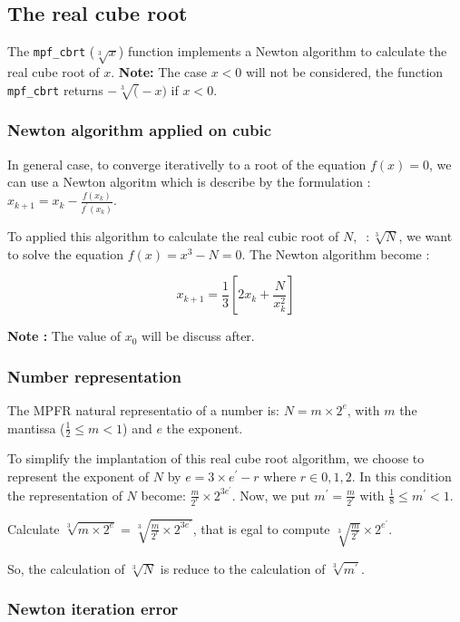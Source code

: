 \documentclass[12pt]{amsart}
\begin{document}
\subsection{The real cube root}

The {\tt mpf\_cbrt} ($\sqrt[3]{x}$) function implements a Newton
algorithm to calculate the real cube root of $x$. {\bf Note:} The case
$x<0$ will not be considered, the function {\tt mpf\_cbrt} returns $-\sqrt[3](-x)$ if $x<0$.

\subsubsection{Newton algorithm applied on cubic}

In general case, to converge iterativelly to a
root of the equation $f(x)=0$, we can use a Newton algoritm which is describe by the formulation :
$x_{k+1}=x_k-\frac{f(x_k)}{f^{'}(x_k)}$.

To applied this algorithm to calculate the real cubic root of
$N,\;\;: \sqrt[3]{N}$, we want to solve the equation $f(x)=x^3-N=0$. The
Newton algorithm become :

\begin{equation}\label{NewtonCbrt}
x_{k+1}=\frac{1}{3}[2x_k+\frac{N}{x^2_k}]
\end{equation}

{\bf Note :} The value of $x_0$ will be discuss after.

\subsubsection{Number representation}

The MPFR natural representatio of a number is: $N=m \times 2^e$, with
$m$ the mantissa ($\frac{1}{2} \leq m < 1$) and $e$ the exponent.

To simplify the implantation of this real cube root algorithm, we
choose to represent the exponent of $N$ by $e=3 \times e^{'}-r$ where $r \in {0,1,2}$.
In this condition the representation of $N$ become:
$\frac{m}{2^r} \times 2^{3 e^{'}}$. Now, we put $m^{'}=\frac{m}{2^r}$
with $\frac{1}{8} \leq m^{'} < 1$.


Calculate $\sqrt[3]{m \times 2^e} = \sqrt[3]{\frac{m}{2^r} \times 2^{3 e^{'}}}$, that is egal to
compute $\sqrt[3]{\frac{m}{2^r}} \times 2^{e^{'}}$.


So, the calculation of $\sqrt[3]{N}$ is reduce to the calculation of
$\sqrt[3]{m^{'}}$.

\subsubsection{Newton iteration error}
\end{document}
